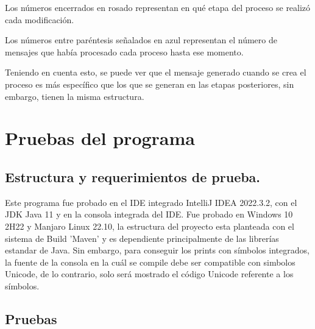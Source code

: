 \documentclass[a4paper]{article}
\begin{document}
    Los números encerrados en rosado representan en qué etapa del proceso se realizó cada modificación. 

    Los números entre paréntesis señalados en azul representan el número de mensajes que había procesado cada proceso hasta ese momento. 

    Teniendo en cuenta esto, se puede ver que el mensaje generado cuando se crea el proceso es más específico que los que se generan en las etapas posteriores, sin embargo, tienen la misma estructura. 

 


\section{Pruebas del programa}

\subsection{Estructura y requerimientos de prueba.}
Este programa fue probado en el IDE integrado IntelliJ IDEA 2022.3.2, con
el JDK Java 11 y en la consola integrada del IDE. Fue probado en Windows 10 
2H22 y Manjaro Linux 22.10, la estructura del proyecto esta planteada con el
sistema de Build 'Maven' y es dependiente principalmente de las librerías estandar
de Java. Sin embargo, para conseguir los prints con símbolos integrados, la fuente
de la consola en la cuál se compile debe ser compatible con simbolos Unicode,
de lo contrario, solo será mostrado el código Unicode referente a los símbolos.

\subsection{Pruebas}
\end{document}

